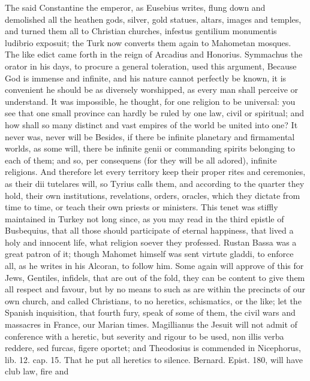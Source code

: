 {The said Constantine the emperor, as Eusebius writes, flung down and
demolished all the heathen gods, silver, gold statues, altars, images
and temples, and turned them all to Christian churches, infestus
gentilium monumentis ludibrio exposuit; the Turk now converts them
again to Mahometan mosques. The like edict came forth in the reign of
Arcadius and Honorius. Symmachus the orator in his days, to
procure a general toleration, used this argument, Because God is
immense and infinite, and his nature cannot perfectly be known, it is
convenient he should be as diversely worshipped, as every man shall
perceive or understand. It was impossible, he thought, for one religion
to be universal: you see that one small province can hardly be ruled by
one law, civil or spiritual; and how shall so many distinct and vast
empires of the world be united into one? It never was, never will be
Besides, if there be infinite planetary and firmamental worlds, as
some will, there be infinite genii or commanding spirits
belonging to each of them; and so, per consequens (for they will be all
adored), infinite religions. And therefore let every territory keep
their proper rites and ceremonies, as their dii tutelares will, so
Tyrius calls them, and according to the quarter they hold, their own
institutions, revelations, orders, oracles, which they dictate from
time to time, or teach their own priests or ministers. This tenet was
stiffly maintained in Turkey not long since, as you may read in the
third epistle of Busbequius, that all those should participate of
eternal happiness, that lived a holy and innocent life, what religion
soever they professed. Rustan Bassa was a great patron of it; though
Mahomet himself was sent virtute gladdi, to enforce all, as he writes
in his Alcoran, to follow him. Some again will approve of this for
Jews, Gentiles, infidels, that are out of the fold, they can be content
to give them all respect and favour, but by no means to such as are
within the precincts of our own church, and called Christians, to no
heretics, schismatics, or the like; let the Spanish inquisition, that
fourth fury, speak of some of them, the civil wars and massacres in
France, our Marian times. Magillianus the Jesuit will not admit
of conference with a heretic, but severity and rigour to be used, non
illis verba reddere, sed furcas, figere oportet; and Theodosius is
commended in Nicephorus, lib. 12. cap. 15. That he put all
heretics to silence. Bernard. Epist. 180, will have club law, fire and
}

